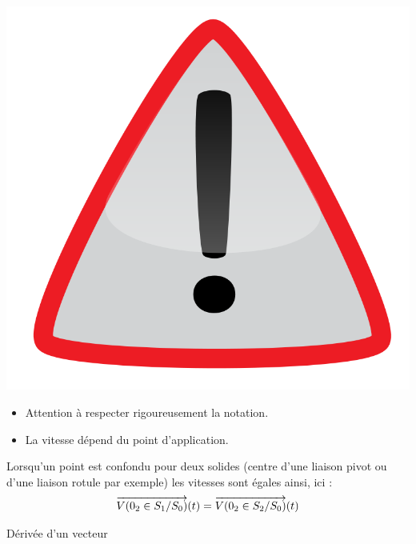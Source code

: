 \documentclass[10pt,oneside]{article}
\begin{document}
\begin{warn}
\begin{minipage}[c]{.15\linewidth}
\begin{center}
\includegraphics[width=.8\textwidth]{png/warning3}
\end{center}
\end{minipage} \hfill
\begin{minipage}[c]{.8\linewidth}
\begin{itemize}
\item Attention à respecter rigoureusement la notation.
\item La vitesse dépend du point d'application.
\end{itemize}
\end{minipage}
\end{warn}


\begin{rem}
\begin{minipage}[c]{.65\linewidth}
Lorsqu'un point est confondu pour deux solides (centre d'une liaison pivot ou d'une liaison rotule par exemple) les vitesses sont égales ainsi, ici : 
$$
\overrightarrow{V(0_2\in S_1/S_0)}(t) = \overrightarrow{V(0_2\in S_2/S_0)}(t)
$$
\end{minipage}\hfill
\begin{minipage}[c]{.3\linewidth}
\begin{center}
\end{center}
\end{minipage}
\end{rem}

\begin{rem}
Dérivée d'un vecteur
\end{rem}
\end{document}

